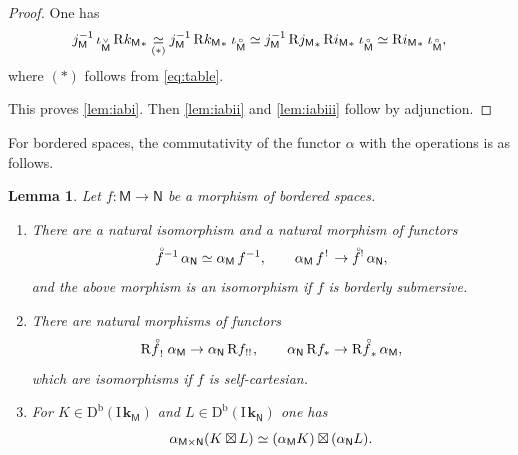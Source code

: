 \documentclass[JEP,XML,SOM,Unicode]{cedram}
\newenvironment{enumeratei}
{\bgroup\def\theenumi{\roman{enumi}}\def\theenumii{\alph{enumii}}\begin{enumerate}}
{\end{enumerate}\egroup}
\theoremstyle{plain}
\newtheorem{lemma}[theorem]{Lemma}
\theoremstyle{definition}
\newcommand{\derived}[1]{\mathrm{#1}}
\newcommand{\derd}{\derived{D}}
\newcommand{\derr}{\derived{R}}
\newcommand{\BDC}{\derd^{\mathrm{b}}}
\newcommand{\roim}[1]{\derr#1_*}
\newcommand{\reim}[1]{\derr#1_{\mspace{.5mu}!}\mspace{2mu}}
\newcommand{\reeim}[1]{\derr#1_{\mspace{1mu}!!}\mspace{1mu}}
\newcommand{\epb}[1]{#1^{\mspace{1.5mu}!}\mspace{2mu}}
\newcommand{\etens}[1][]{\mathbin{\boxtimes_{\raise1.5ex\hbox to-.1em{}#1}}}
\newcommand{\field}{\mathbf{k}}\let\cor\field
\newcommand{\ind}{\mathrm{I}\mspace{2mu}}
\newcommand{\ifield}{\ind\field}
\newcommand{\bclose}[1]{{\accentset{\vee}{#1}}}\let\cc\bclose
\newcommand{\unbordered}[1]{{\accentset{\circ}{#1}}}
\let\oo \unbordered
\newcommand{\bbM}{\mathsf{M}}
\newcommand{\obM}{\unbordered{\bbM}}
\newcommand{\cbM}{\bclose{\bbM}}
\newcommand{\bbN}{\mathsf{N}}
\newcommand{\inc}[1][\bbM]{k_{#1}}
\newcommand{\opb}[1]{#1^{-1}}
\begin{document}
\begin{proof}
One has
\[
\opb j_\bbM\, \iota_\cbM \,\roim{{\inc}}
\underset{(*)}\simeq \opb j_\bbM \,\roim{{\inc}}\; \iota_\obM
\simeq \opb j_\bbM \,\roim{{j_\bbM}} \,\roim{{i_\bbM}}\; \iota_\obM
\simeq \roim{{i_\bbM}}\; \iota_\obM ,
\]
where $(*)$ follows from \eqref{eq:table}.

This proves \eqref{lem:iabi}. Then \eqref{lem:iabii} and \eqref{lem:iabiii} follow by adjunction.
\end{proof}

For bordered spaces, the commutativity of the functor $\alpha$ with the operations is as follows.

\begin{lemma}\label{lem:alphaop}
Let $f\colon\bbM\to\bbN$ be a morphism of bordered spaces.
\begin{enumeratei}
\item\label{lem:alphaopi}
There are a natural isomorphism and a natural morphism of functors
\[
\oo f{}^{-1} \, \alpha_{\bbN} \simeq \alpha_{\bbM} \, \opb f , \qquad
\alpha_{\bbM} \, \epb f \to \oo f{}^! \, \alpha_{\bbN} ,
\]
and the above morphism is an isomorphism if $f$ is borderly submersive.
\item\label{lem:alphaopii}
There are natural morphisms of functors
\[
\reim {\oo f} \, \alpha_{\bbM} \to \alpha_{\bbN} \, \reeim f, \qquad
\alpha_{\bbN} \, \roim f \to \roim {\oo f} \, \alpha_{\bbM},
\]
which are isomorphisms if $f$ is self-cartesian.
\item\label{lem:alphaopiii}
For $K\in\BDC(\ifield_\bbM)$ and $L\in\BDC(\ifield_\bbN)$ one has
\[
\alpha_{\bbM\times\bbN}(K\etens L) \simeq (\alpha_\bbM K)\etens(\alpha_\bbN L).
\]
\end{enumeratei}
\end{lemma}
\end{document}

